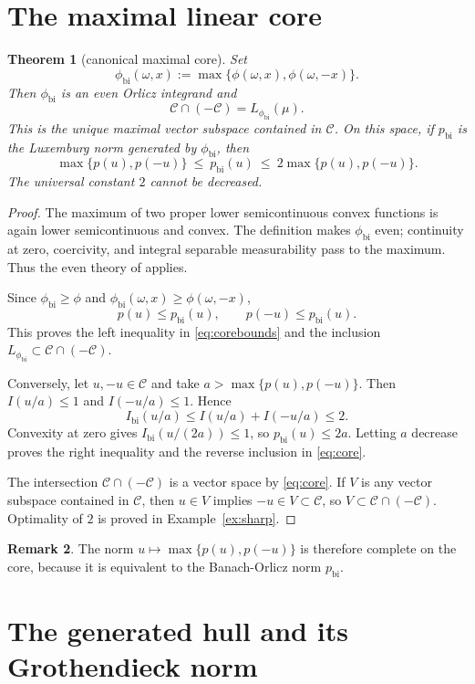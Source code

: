 \documentclass[11pt]{article}
\newtheorem{theorem}{Theorem}
\theoremstyle{definition}
\newtheorem{remark}[theorem]{Remark}
\newcommand{\cC}{\mathcal C}
\newcommand{\phib}{\phi_{\mathrm{bi}}}
\begin{document}
\section{The maximal linear core}

\begin{theorem}[canonical maximal core]\label{thm:core}
Set
\[
 \phib(\omega,x):=\max\{\phi(\omega,x),\phi(\omega,-x)\}.
\]
Then $\phib$ is an even Orlicz integrand and
\[
 \cC\cap(-\cC)=L_{\phib}(\mu).
\tag{4.1}\label{eq:core}
\]
This is the unique maximal vector subspace contained in $\cC$.  On this
space, if $p_{\mathrm{bi}}$ is the Luxemburg norm generated by $\phib$, then
\[
 \max\{p(u),p(-u)\}
 \ \le\ p_{\mathrm{bi}}(u)\
 \le\ 2\max\{p(u),p(-u)\}.
\tag{4.2}\label{eq:corebounds}
\]
The universal constant $2$ cannot be decreased.
\end{theorem}

\begin{proof}
The maximum of two proper lower semicontinuous convex functions is again
lower semicontinuous and convex.  The definition makes $\phib$ even;
continuity at zero, coercivity, and integral separable measurability pass to
the maximum.  Thus the even theory of \cite{Ruf2023} applies.

Since $\phib\ge\phi$ and $\phib(\omega,x)\ge\phi(\omega,-x)$,
\[
 p(u)\le p_{\mathrm{bi}}(u),\qquad p(-u)\le p_{\mathrm{bi}}(u).
\]
This proves the left inequality in \eqref{eq:corebounds} and the inclusion
$L_{\phib}\subset\cC\cap(-\cC)$.

Conversely, let $u,-u\in\cC$ and take
$a>\max\{p(u),p(-u)\}$.  Then $I(u/a)\le1$ and $I(-u/a)\le1$.  Hence
\[
 I_{\mathrm{bi}}(u/a)
 \le I(u/a)+I(-u/a)\le2.
\]
Convexity at zero gives
$I_{\mathrm{bi}}(u/(2a))\le1$, so
$p_{\mathrm{bi}}(u)\le2a$.  Letting $a$ decrease proves the right inequality
and the reverse inclusion in \eqref{eq:core}.

The intersection $\cC\cap(-\cC)$ is a vector space by
\eqref{eq:core}.  If $V$ is any vector subspace contained in $\cC$, then
$u\in V$ implies $-u\in V\subset\cC$, so $V\subset\cC\cap(-\cC)$.
Optimality of $2$ is proved in Example~\ref{ex:sharp}.
\end{proof}

\begin{remark}
The norm $u\mapsto\max\{p(u),p(-u)\}$ is therefore complete on the core,
because it is equivalent to the Banach-Orlicz norm $p_{\mathrm{bi}}$.
\end{remark}

\section{The generated hull and its Grothendieck norm}
\end{document}
